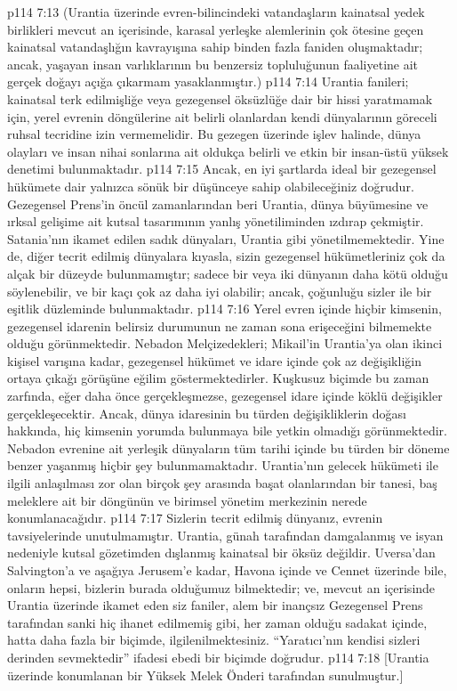 \vs p114 7:13 (Urantia üzerinde evren\hyp{}bilincindeki vatandaşların kainatsal yedek birlikleri mevcut an içerisinde, karasal yerleşke alemlerinin çok ötesine geçen kainatsal vatandaşlığın kavrayışına sahip binden fazla faniden oluşmaktadır; ancak, yaşayan insan varlıklarının bu benzersiz topluluğunun faaliyetine ait gerçek doğayı açığa çıkarmam yasaklanmıştır.)
\vs p114 7:14 Urantia fanileri; kainatsal terk edilmişliğe veya gezegensel öksüzlüğe dair bir hissi yaratmamak için, yerel evrenin döngülerine ait belirli olanlardan kendi dünyalarının göreceli ruhsal tecridine izin vermemelidir. Bu gezegen üzerinde işlev halinde, dünya olayları ve insan nihai sonlarına ait oldukça belirli ve etkin bir insan\hyp{}üstü yüksek denetimi bulunmaktadır.
\vs p114 7:15 Ancak, en iyi şartlarda ideal bir gezegensel hükümete dair yalnızca sönük bir düşünceye sahip olabileceğiniz doğrudur. Gezegensel Prens’in öncül zamanlarından beri Urantia, dünya büyümesine ve ırksal gelişime ait kutsal tasarımının yanlış yönetiliminden ızdırap çekmiştir. Satania’nın ikamet edilen sadık dünyaları, Urantia gibi yönetilmemektedir. Yine de, diğer tecrit edilmiş dünyalara kıyasla, sizin gezegensel hükümetleriniz çok da alçak bir düzeyde bulunmamıştır; sadece bir veya iki dünyanın daha kötü olduğu söylenebilir, ve bir kaçı çok az daha iyi olabilir; ancak, çoğunluğu sizler ile bir eşitlik düzleminde bulunmaktadır.
\vs p114 7:16 Yerel evren içinde hiçbir kimsenin, gezegensel idarenin belirsiz durumunun ne zaman sona erişeceğini bilmemekte olduğu görünmektedir. Nebadon Melçizedekleri; Mikail’in Urantia’ya olan ikinci kişisel varışına kadar, gezegensel hükümet ve idare içinde çok az değişikliğin ortaya çıkağı görüşüne eğilim göstermektedirler. Kuşkusuz biçimde bu zaman zarfında, eğer daha önce gerçekleşmezse, gezegensel idare içinde köklü değişikler gerçekleşecektir. Ancak, dünya idaresinin bu türden değişikliklerin doğası hakkında, hiç kimsenin yorumda bulunmaya bile yetkin olmadığı görünmektedir. Nebadon evrenine ait yerleşik dünyaların tüm tarihi içinde bu türden bir döneme benzer yaşanmış hiçbir şey bulunmamaktadır. Urantia’nın gelecek hükümeti ile ilgili anlaşılması zor olan birçok şey arasında başat olanlarından bir tanesi, baş meleklere ait bir döngünün ve birimsel yönetim merkezinin nerede konumlanacağıdır.
\vs p114 7:17 Sizlerin tecrit edilmiş dünyanız, evrenin tavsiyelerinde unutulmamıştır. Urantia, günah tarafından damgalanmış ve isyan nedeniyle kutsal gözetimden dışlanmış kainatsal bir öksüz değildir. Uversa’dan Salvington’a ve aşağıya Jerusem’e kadar, Havona içinde ve Cennet üzerinde bile, onların hepsi, bizlerin burada olduğumuz bilmektedir; ve, mevcut an içerisinde Urantia üzerinde ikamet eden siz faniler, alem bir inançsız Gezegensel Prens tarafından sanki hiç ihanet edilmemiş gibi, her zaman olduğu sadakat içinde, hatta daha fazla bir biçimde, ilgilenilmektesiniz. “Yaratıcı’nın kendisi sizleri derinden sevmektedir” ifadesi ebedi bir biçimde doğrudur.
\vs p114 7:18 [Urantia üzerinde konumlanan bir Yüksek Melek Önderi tarafından sunulmuştur.]
